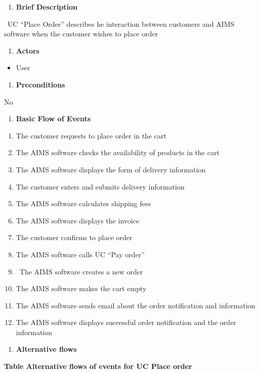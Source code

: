 \documentclass[letterpaper]{report}
\begin{document}
\begin{enumerate}
\item \textbf{Brief Description}
\end{enumerate}
\ UC “Place Order” describes he interaction between customers and AIMS software when the customer wishes to place order

\begin{enumerate}
\item \textbf{Actors}
\end{enumerate}
\begin{itemize}
\item User
\end{itemize}
\begin{enumerate}
\item \textbf{Preconditions}
\end{enumerate}
No

\begin{enumerate}
\item \textbf{Basic Flow of Events}
\end{enumerate}
\begin{enumerate}
\item The customer requests to place order in the cart 
\item The AIMS software checks the availability of products in the cart 
\item The AIMS software displays the form of delivery information 
\item The customer enters and submits delivery information 
\item The AIMS software calculates shipping fees 
\item The AIMS software displays the invoice 
\item The customer confirms to place order 
\item The AIMS software calls UC “Pay order” 
\item \ The AIMS software creates a new order 
\item The AIMS software makes the cart empty 
\item The AIMS software sends email about the order notification and information 
\item The AIMS software displays successful order notification and the order information
\end{enumerate}
\begin{enumerate}
\item \textbf{Alternative flows}
\end{enumerate}
{\bfseries
Table Alternative flows of events for UC Place order}
\end{document}
